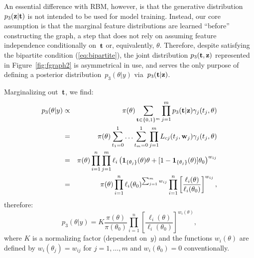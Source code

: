 \documentclass[english]{scrartcl}
\begin{document}

An essential difference with RBM, however, is that the generative distribution $p_3({\bf z}|{\bf t})$ is not intended to be used for model training. Instead, our core assumption is that the marginal feature distributions are learned ``before'' constructing the graph, a step that does not rely on assuming feature independence conditionally on~${\bf t}$ or, equivalently, $\theta$. Therefore, despite satisfying the bipartite condition (\ref{eq:bipartite}), the joint distribution $p_3({\bf t},{\bf z})$ represented in Figure~\ref{fig:fgraph2} is asymmetrical in use, and serves the only purpose of defining a posterior distribution~$p_3(\theta|y)$ via~$p_3({\bf t}|{\bf z})$.

Marginalizing out~${\bf t}$, we find:
\begin{eqnarray*}
p_3(\theta|y) 
& \propto & 
\pi(\theta) \sum_{{\bf t}\in \{0,1\}^m} 
\prod_{j=1}^m p_3({\bf t}|{\bf z}) \gamma_j(t_j,\theta) \\
& = & 
\pi(\theta) \sum_{t_1=0}^{1}\ldots \sum_{t_m=0}^{1} 
\prod_{j=1}^m L_{cj}(t_j, \mathbf{w}_j) \gamma_j(t_j,\theta) \\
& = & 
\pi(\theta) 
\prod_{i=1}^n
\prod_{j=1}^m
\ell_i \left(
\mathbf{1}_{\{\theta_j\}}(\theta) \theta + [1-\mathbf{1}_{\{\theta_j\}}(\theta)]\theta_0
\right)^{w_{ij}} \\
& = & 
\pi(\theta) 
\prod_{i=1}^n \ell_i(\theta_0)^{\sum_{j=1}^m w_{ij}}
\prod_{i=1}^n \left[
\frac{\ell_i(\theta)}{\ell_i(\theta_0)}
\right]^{w_{ij}}
,
\end{eqnarray*}
therefore:
\begin{equation}
\label{eq:new_pool}
p_3(\theta|y) 
=
K \frac{\pi(\theta)}{\pi(\theta_0)}
\prod_{i=1}^n \left[
\frac{\ell_i(\theta)}{\ell_i(\theta_0)}
\right]^{w_i(\theta)},
\end{equation}
where $K$ is a normalizing factor (dependent on~$y$) and the functions $w_i(\theta)$ are defined by $w_i(\theta_j)=w_{ij}$ for $j=1,\ldots,m$ and $w_i(\theta_0)=0$ conventionally. 
\end{document}
